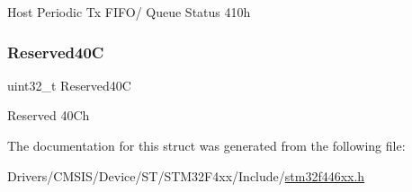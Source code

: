 Host Periodic Tx F\+I\+F\+O/ Queue Status 410h \mbox{\label{struct_u_s_b___o_t_g___host_type_def_af66e42cdb83dc2eb156dfbbf42890f79}} 
\subsubsection{\texorpdfstring{Reserved40C}{Reserved40C}}
{\footnotesize\ttfamily uint32\+\_\+t Reserved40C}

Reserved 40\+Ch 

The documentation for this struct was generated from the following file\+:\begin{DoxyCompactItemize}
\item 
Drivers/\+C\+M\+S\+I\+S/\+Device/\+S\+T/\+S\+T\+M32\+F4xx/\+Include/\mbox{\hyperlink{stm32f446xx_8h}{stm32f446xx.\+h}}\end{DoxyCompactItemize}
